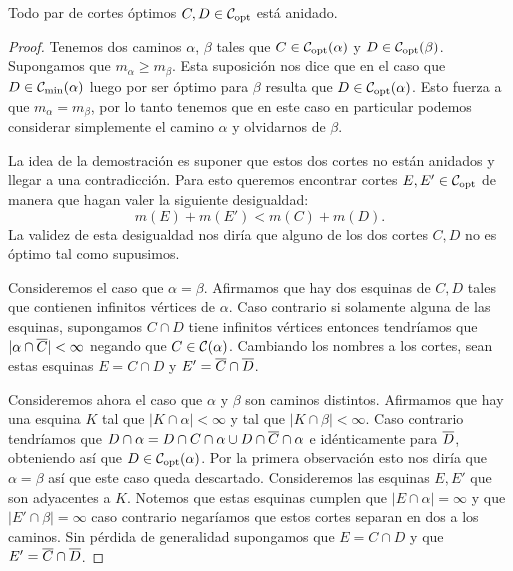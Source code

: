 \documentclass[tesis.tex]{subfiles}
\begin{document}
\begin{teo}\label{teo_copt_anidados}
	Todo par de cortes óptimos $C,D \in {\cal C}_{\text{opt}}$ está anidado.
\end{teo}
\begin{proof}
	Tenemos dos caminos $\alpha$, $\beta$ tales que $C \in {\cal C}_{\text{opt}}(\alpha)$ y $D \in {\cal C}_{\text{opt}}(\beta)$.
	Supongamos que $m_{\alpha} \ge m_{\beta}$.
	Esta suposición nos dice que en el caso que $D \in {\cal C}_{\text{min}}(\alpha)$ luego por ser óptimo para $\beta$ resulta que $D \in {\cal C}_{\text{opt}}(\alpha)$.
	Esto fuerza a que $m_{\alpha} = m_{\beta}$, por lo tanto tenemos que en este caso en particular podemos considerar simplemente el camino $\alpha$ y olvidarnos de $\beta$.
	
	La idea de la demostración es suponer que estos dos cortes no están anidados y llegar a una contradicción.
	Para esto queremos encontrar cortes $E, E' \in {\cal C}_{\text{opt}}$ de manera que hagan valer la siguiente desigualdad:
	\[
		m(E) + m(E') < m(C) + m(D).
	\]   
	La validez de esta desigualdad nos diría que alguno de los dos cortes $C,D$ no es óptimo tal como supusimos.
	
	Consideremos el caso que $\alpha = \beta$.
	Afirmamos que hay dos esquinas de $C,D$ tales que contienen infinitos vértices de $\alpha$.
	Caso contrario si solamente alguna de las esquinas, supongamos $C \cap D$ tiene infinitos vértices entonces tendríamos que $|\alpha \cap \overline C| < \infty$ negando que $C \in {\cal C}(\alpha)$.
	Cambiando los nombres a los cortes, sean estas esquinas $E = C \cap D$ y $E' = \overline C \cap \overline D$.
	
	Consideremos ahora el caso que $\alpha$ y $\beta$ son caminos distintos.
	Afirmamos que hay una esquina $K$ tal que $|K \cap \alpha| < \infty$ y tal que $|K \cap \beta| < \infty$.
	Caso contrario tendríamos que $D \cap \alpha = D \cap C \cap \alpha  \cup D \cap \overline C \cap \alpha$ e idénticamente para $\overline D$, obteniendo así que $D \in {\cal C}_{\text{opt}}(\alpha)$.
	Por la primera observación esto nos diría que $\alpha = \beta$ así que este caso queda descartado.
	Consideremos las esquinas $E,E'$ que son adyacentes a $K$.
	Notemos que estas esquinas cumplen que $|E \cap \alpha| = \infty$ y que $|E' \cap \beta| = \infty$ caso contrario negaríamos que estos cortes separan en dos a los caminos.
	Sin pérdida de generalidad supongamos que $E = C \cap D$ y que $E' = \overline C \cap \overline D$.
	

\end{proof}
\end{document}
